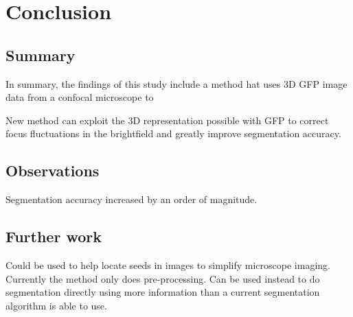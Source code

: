 
\chapter{Conclusion}

\ifpdf
    \graphicspath{{Chapter6/Figs/Raster/}{Chapter6/Figs/PDF/}{Chapter6/Figs/}}
\else
    \graphicspath{{Chapter6/Figs/Vector/}{Chapter6/Figs/}}
\fi

\section{Summary}

In summary, the findings of this study include a method hat uses 3D GFP image data from a confocal microscope to 

New method can exploit the 3D representation possible with GFP to correct focus fluctuations in the brightfield and greatly improve segmentation accuracy.

\section{Observations}

Segmentation accuracy increased by an order of magnitude.

\section{Further work}

Could be used to help locate seeds in images to simplify microscope imaging.
Currently the method only does pre-processing. Can be used instead to do segmentation directly using more information than a current segmentation algorithm is able to use.
